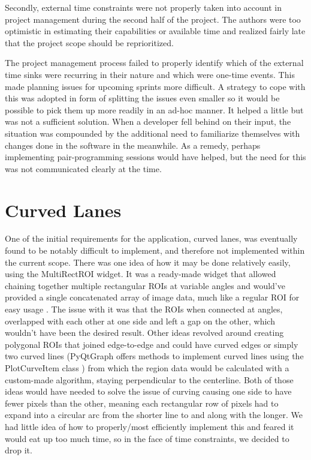 Secondly, external time constraints were not properly taken into account in project management during the second half of the project. The authors were too optimistic in estimating their capabilities or available time and realized fairly late that the project scope should be reprioritized.

The project management process failed to properly identify which of the external time sinks were recurring in their nature and which were one-time events. This made planning issues for upcoming sprints more difficult. A strategy to cope with this was adopted in form of splitting the issues even smaller so it would be possible to pick them up more readily in an ad-hoc manner. It helped a little but was not a sufficient solution. When a developer fell behind on their input, the situation was compounded by the additional need to familiarize themselves with changes done in the software in the meanwhile. As a remedy, perhaps implementing pair-programming sessions would have helped, but the need for this was not communicated clearly at the time.

\section{Curved Lanes}
One of the initial requirements for the application, curved lanes, was eventually found to be notably difficult to implement, and therefore not implemented within the current scope. There was one idea of how it may be done relatively easily, using the MultiRectROI widget. It was a ready-made widget that allowed chaining together multiple rectangular ROIs at variable angles and would've provided a single concatenated array of image data, much like a regular ROI for easy usage \cite{multi-rect-roi}. The issue with it was that the ROIs when connected at angles, overlapped with each other at one side and left a gap on the other, which wouldn't have been the desired result. Other ideas revolved around creating polygonal ROIs that joined edge-to-edge and could have curved edges or simply two curved lines (PyQtGraph offers methods to implement curved lines using the PlotCurveItem class \cite{plot-curve-item}) from which the region data would be calculated with a custom-made algorithm, staying perpendicular to the centerline. Both of those ideas would have needed to solve the issue of curving causing one side to have fewer pixels than the other, meaning each rectangular row of pixels had to expand into a circular arc from the shorter line to and along with the longer. We had little idea of how to properly/most efficiently implement this and feared it would eat up too much time, so in the face of time constraints, we decided to drop it.


